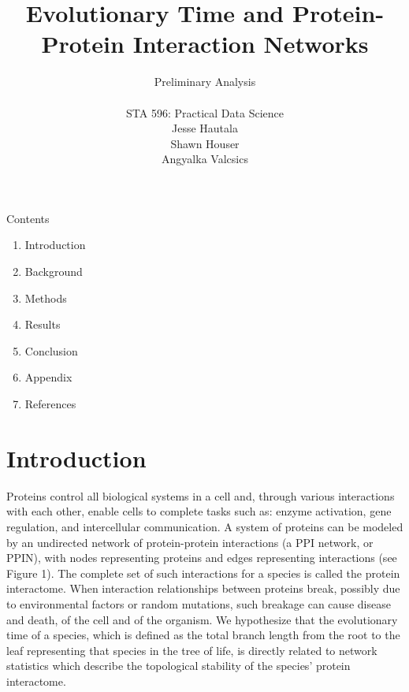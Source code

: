 \documentclass[12pt]{article}
\begin{document}
\title{\textbf{Evolutionary Time and Protein-Protein Interaction Networks}}
\author{Preliminary Analysis \\ \\ STA 596: Practical Data Science \\ Jesse Hautala \\ Shawn Houser \\ Angyalka Valcsics }

	\maketitle
\onehalfspacing

\noindent Contents
\begin{enumerate}[label = \Roman{*}.]
\item Introduction
\item Background
\item Methods
\item Results
\item Conclusion
\item Appendix
\item References \newline
\end{enumerate}

\section{Introduction}
Proteins control all biological systems in a cell and, through various interactions with each other, enable cells to complete tasks such as: enzyme activation, gene regulation, and intercellular communication. A system of proteins can be modeled by an undirected network of protein-protein interactions (a PPI network, or PPIN), with nodes representing proteins and edges representing interactions (see Figure 1). The complete set of such interactions for a species is called the protein interactome. When interaction relationships between proteins break, possibly due to environmental factors or random mutations, such breakage can cause disease and death, of the cell and of the organism. We hypothesize that the evolutionary time of a species, which is defined as the total branch length from the root to the leaf representing that species in the tree of life, is directly related to network statistics which describe the topological stability of the species’ protein interactome.
\end{document}
